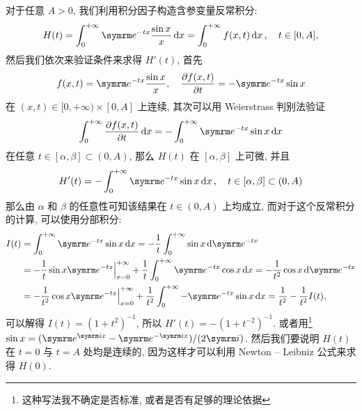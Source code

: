 \begin{exercise}[series=exer]
\begin{answer}
        对于任意 $ A > 0 $, 我们利用积分因子构造含参变量反常积分:
        \begin{align*}
            H(t) = \int_{0}^{+\infty} \me^{-tx}\frac{\sin x}{x} \dd{x} = \int_{0}^{+\infty} f(x, t) \dd{x},\quad t \in [0, A],
        \end{align*}
        然后我们依次来验证条件来求得 $ H'(t) $, 首先
        \begin{align*}
            f(x, t) = \me^{-tx}\frac{\sin x}{x}, \quad \pdv{f(x, t)}{t} = -\me^{-tx}\sin x
        \end{align*}
        在 $ (x, t) \in [0, +\infty)\times [0, A] $ 上连续, 其次可以用 Weierstrass 判别法验证
        \begin{align*}
            \int_{0}^{+\infty} \pdv{f(x, t)}{t} \dd{x} = - \int_{0}^{+\infty} \me^{-tx}\sin x \dd{x}
        \end{align*}
        在任意 $ t \in [\alpha, \beta] \subset (0, A) $, 那么 $ H(t) $ 在 $ [\alpha, \beta] $ 上可微, 并且
        \begin{align*}
            H'(t) = - \int_{0}^{+\infty} \me^{-tx}\sin x \dd{x}, \quad t \in [\alpha, \beta] \subset (0, A)
        \end{align*}
        那么由 $ \alpha $ 和 $ \beta $ 的任意性可知该结果在 $ t\in (0, A) $ 上均成立, 而对于这个反常积分的计算, 可以使用分部积分:
        \begin{align*}
            I(t) & = \int_{0}^{+\infty} \me^{-tx}\sin x \dd{x} = -\frac{1}{t}\int_{0}^{+\infty} \sin x\dd{\me^{-tx}}\\
            & = -\frac{1}{t}\sin x\me^{-tx}\Big|_{x = 0}^{+\infty} + \frac{1}{t} \int_{0}^{+\infty} \me^{-tx}\cos x \dd{x} = -\frac{1}{t^{2}} \cos x\dd{\me^{-tx}}\\
            & = -\frac{1}{t^{2}}\cos x\me^{-tx}\Big|_{x = 0}^{+\infty} + \frac{1}{t^{2}}\int_{0}^{+\infty} -\me^{-tx}\sin x \dd{x} = \frac{1}{t^{2}} - \frac{1}{t^{2}} I(t),
        \end{align*}
        可以解得 $ I(t) = (1 + t^{2})^{-1} $, 所以 $ H'(t) = -(1 + t^{-2})^{-1} $. 或者用\footnote{这种写法我不确定是否标准, 或者是否有足够的理论依据} $ \sin x = (\me^{\mi x} - \me^{-\mi x})/(2\mi) $. 然后我们要说明 $ H(t) $ 在 $ t = 0 $ 与 $ t = A $ 处均是连续的, 因为这样才可以利用 Newton -- Leibniz 公式来求得 $ H(0) $. 


\end{answer}
\end{exercise}
